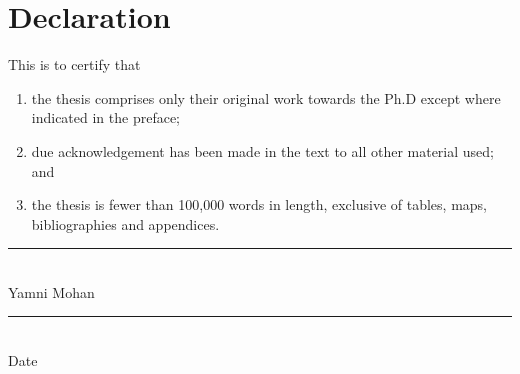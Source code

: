 \chapter*{Declaration}

This is to certify that

\begin{enumerate}
	\item the thesis comprises only their original work towards the Ph.D except where indicated in the preface;
	\item due acknowledgement has been made in the text to all other material used; and
	\item the thesis is fewer than 100,000 words in length, exclusive of
	tables, maps, bibliographies and appendices.
\end{enumerate}
\vspace*{3cm}

\begin{flushright}
	\rule{0.4\textwidth}{0.4pt} \\
	\vspace*{2mm}
	Yamni Mohan\\
	\vspace*{1cm}
	\rule{0.4\textwidth}{0.4pt} \\
	\vspace*{2mm}
	Date
\end{flushright}